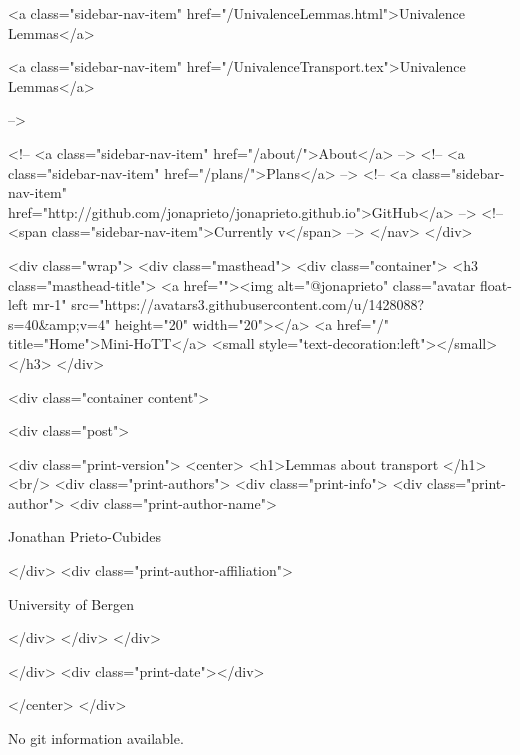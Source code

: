       
    
      
        
          <a class="sidebar-nav-item" href="/UnivalenceLemmas.html">Univalence Lemmas</a>
        
      
    
      
        
          <a class="sidebar-nav-item" href="/UnivalenceTransport.tex">Univalence Lemmas</a>
        
      
     -->

    <!-- <a class="sidebar-nav-item" href="/about/">About</a> -->
    <!-- <a class="sidebar-nav-item" href="/plans/">Plans</a> -->
    <!-- <a class="sidebar-nav-item" href="http://github.com/jonaprieto/jonaprieto.github.io">GitHub</a> -->
    <!-- <span class="sidebar-nav-item">Currently v</span> -->
  </nav>
</div>

    <div class="wrap">
      <div class="masthead">
        <div class="container">
          <h3 class="masthead-title">
            <a href=""><img alt="@jonaprieto" class="avatar float-left mr-1" src="https://avatars3.githubusercontent.com/u/1428088?s=40&amp;v=4" height="20" width="20"></a>
            <a href="/" title="Home">Mini-HoTT</a>
            <small style="text-decoration:left"></small>
          </h3>
        </div>
      
      <div class="container content">
        







<div class="post">

  <div class="print-version">
    <center>
      <h1>Lemmas about transport </h1><br/>
        <div class="print-authors">
          <div class="print-info">
            <div class="print-author">
              <div class="print-author-name">
                
                  Jonathan Prieto-Cubides
                
              </div>
              <div class="print-author-affiliation">
                
                  University of Bergen
                
                </div>
            </div>
          </div>
          
          
        </div>
        <div class="print-date"></div>
        
        
    </center>
  </div>

  
  No git information available.
  
